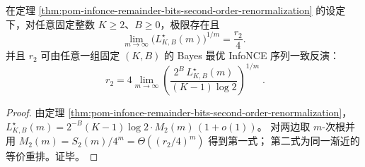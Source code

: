 \begin{corollary}\label{cor:pom-infonce-exponential-invariant-r2-identifiability}
在定理 \ref{thm:pom-infonce-remainder-bits-second-order-renormalization} 的设定下，对任意固定整数 \(K\ge 2\)、\(B\ge 0\)，极限存在且
\[
\lim_{m\to\infty}\bigl(L_{K,B}^\star(m)\bigr)^{1/m}=\frac{r_2}{4}.
\]
并且 \(r_2\) 可由任意一组固定 \((K,B)\) 的 Bayes 最优 InfoNCE 序列一致反演：
\[
\boxed{\;
r_2
=4\lim_{m\to\infty}\left(\frac{2^B\,L_{K,B}^\star(m)}{(K-1)\log 2}\right)^{1/m}\; }.
\]
\end{corollary}
\begin{proof}
由定理 \ref{thm:pom-infonce-remainder-bits-second-order-renormalization}，
\(
L_{K,B}^\star(m)
=2^{-B}(K-1)\log 2\cdot M_2(m)\,(1+o(1))
\)。
对两边取 \(m\)-次根并用 \(M_2(m)=S_2(m)/4^m=\Theta((r_2/4)^m)\) 得到第一式；
第二式为同一渐近的等价重排。证毕。
\end{proof}


